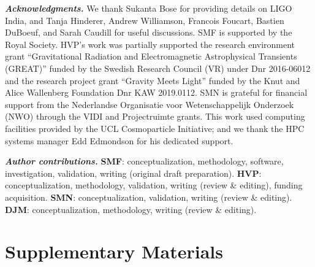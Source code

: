 \documentclass[%
 reprint,
 superscriptaddress,
 nofootinbib,
 amsmath,amssymb,
 aps,
]{revtex4-2}
\begin{document}

\textbf{\emph{Acknowledgments.}} We thank Sukanta Bose for providing details on LIGO India, and Tanja Hinderer, Andrew Williamson, Francois Foucart, Bastien DuBoeuf, and Sarah Caudill for useful discussions. SMF is supported by the Royal Society. HVP's work was partially supported the research environment grant ``Gravitational Radiation and Electromagnetic Astrophysical Transients (GREAT)'' funded by the Swedish Research Council (VR) under Dnr 2016-06012 and the research project grant ``Gravity Meets Light'' funded by the Knut and Alice Wallenberg Foundation Dnr KAW 2019.0112. SMN is grateful for financial support from the Nederlandse Organisatie voor Wetenschappelijk Onderzoek (NWO) through the VIDI and Projectruimte grants. This work used computing facilities provided by the UCL Cosmoparticle Initiative; and we thank the HPC systems manager Edd Edmondson for his dedicated support.

\textbf{\emph{Author contributions.}} {\bf SMF}: conceptualization, methodology, software, investigation, validation, writing (original draft preparation). {\bf HVP}: conceptualization, methodology, validation, writing (review \& editing), funding acquisition. {\bf SMN}: conceptualization, validation, writing (review \& editing). {\bf DJM}: conceptualization, methodology, writing (review \& editing).


\appendix

\section{Supplementary Materials}
\end{document}
